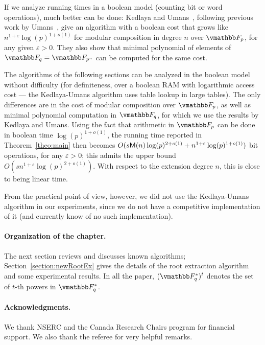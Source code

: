 If we analyze running times in a boolean model (counting bit or word
operations), much better can be done: Kedlaya and Umans~\cite{KeUm11},
following previous work by Umans~\cite{Umans08}, give an algorithm
with a boolean cost that grows like $n^{1+\varepsilon}
\log(p)^{1+o(1)}$ for modular composition in degree $n$ over $\F_p$,
for any given $\varepsilon > 0$. They also show that minimal polynomial
of elements of $\F_q=\F_{p^n}$ can be computed for the same cost.

The algorithms of the following sections can be analyzed in the
boolean model without difficulty (for definiteness, over a boolean RAM
with logarithmic access cost --- the Kedlaya-Umans algorithm uses
table lookup in large tables). The only differences are in the cost of
modular composition over $\F_p$, as well as minimal polynomial
computation in $\F_q$, for which we use the results by Kedlaya and
Umans. Using the fact that arithmetic in $\F_p$ can be done in boolean
time $\log(p)^{1+o(1)}$, the running time reported in
Theorem~\ref{theo:main} then becomes $O(s \mathsf{M}(n)\log(p)^{2+o(1)} +
n^{1+\varepsilon}\log(p)^{1+o(1)})$ bit operations, for any
$\varepsilon > 0$; this admits the upper bound
$O(sn^{1+\varepsilon}\log(p)^{2+o(1)})$. With respect to the extension
degree $n$, this is close to being linear time.

From the practical point of view, however, we did not use the
Kedlaya-Umans algorithm in our experiments, since we do not have a
competitive implementation of it (and currently know of no such
implementation).

\paragraph{Organization of the chapter.} 
The next section reviews and discusses known algorithms;
Section~\ref{section:newRootEx} gives the details of the root
extraction algorithm and some experimental results. In all the paper,
$(\F_q^*)^t$ denotes the set of $t$-th powers in $\F_q^*$.

\paragraph{Acknowledgments.} We thank NSERC and the Canada Research
Chairs program for financial support. We also thank the referee for
very helpful remarks.


